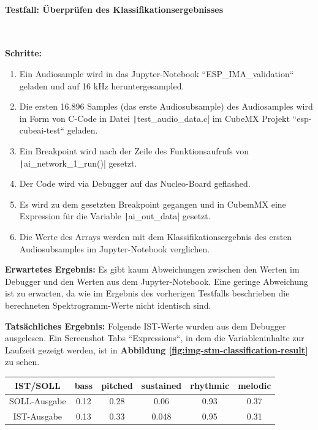 \paragraph{Testfall: Überprüfen des Klassifikationsergebnisses}\mbox{}\\
\begin{adjustwidth}{0.5cm}{0cm}
\textbf{Schritte:}
\begin{enumerate}
	\item Ein Audiosample wird in das Jupyter-Notebook ``ESP\_IMA\_validation`` geladen und auf 16 kHz heruntergesampled.
	\item Die ersten 16.896 Samples (das erste Audiosubsample) des Audiosamples wird in Form von C-Code in Datei \texttt|test_audio_data.c| im CubeMX Projekt ``esp-cubeai-test`` geladen.
	\item Ein Breakpoint wird nach der Zeile des Funktionsaufrufs von \texttt|ai_network_1_run()| gesetzt.
	\item Der Code wird via Debugger auf das Nucleo-Board geflashed.
	\item Es wird zu dem gesetzten Breakpoint gegangen und in CubemMX eine Expression für die Variable \texttt|ai_out_data| gesetzt.
	\item Die Werte des Arrays werden mit dem Klassifikationsergebnis des ersten Audiosubsamples im Jupyter-Notebook verglichen.
\end{enumerate}

\textbf{Erwartetes Ergebnis:} Es gibt kaum Abweichungen zwischen den Werten im Debugger und den Werten aus dem Jupyter-Notebook. Eine geringe Abweichung ist zu erwarten, da wie im Ergebnis des vorherigen Testfalls beschrieben die berechneten Spektrogramm-Werte nicht identisch sind.


\textbf{Tatsächliches Ergebnis:}
Folgende IST-Werte wurden aus dem Debugger ausgelesen. Ein Screenshot Tabs ``Expressions``, in dem die Variableninhalte zur Laufzeit gezeigt werden, ist in \textbf{Abbildung \ref{fig:img-stm-classification-result}} zu sehen.

\begin{tabular}{|c|c|c|c|c|c|}
    \hline
    IST/SOLL & bass & pitched & sustained & rhythmic & melodic \\ \hline
    SOLL-Ausgabe & 0.12 & 0.28 & 0.06 & 0.93 & 0.37 \\ \hline
    IST-Ausgabe & 0.13 & 0.33 & 0.048 & 0.95 & 0.31 \\ \hline
\end{tabular}


\end{adjustwidth}
